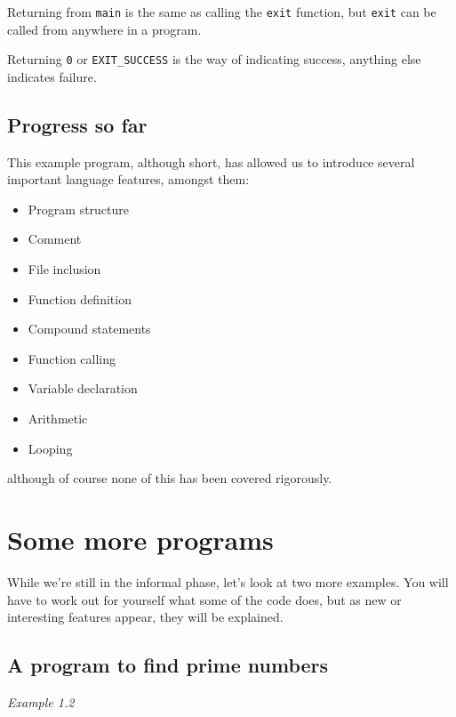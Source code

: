     Returning from \texttt{main} is the same as calling the
     \texttt{exit} function, but \texttt{exit} can be called from
     anywhere in a program.

    Returning \texttt{0} or \texttt{EXIT\_SUCCESS} is the way of
     indicating success, anything else indicates failure.

   

  

  \subsection{Progress so far}
   

   This example program, although short, has allowed us to introduce several
    important language features, amongst them:


   \begin{itemize}
    \item Program structure
    \item Comment
    \item File inclusion
    \item Function definition
    \item Compound statements
    \item Function calling
    \item Variable declaration
    \item Arithmetic
    \item Looping
   \end{itemize}

   although of course none of this has been covered rigorously.


  

 
        \section{Some more programs}
        

  

  While we're still in the informal phase, let's look at two more examples.
   You will have to work out for yourself what some of the code does, but as
   new or interesting features appear, they will be explained.


  \subsection{A program to find prime numbers}
   

   \begin{center}\textit{Example 1.2}\end{center}


